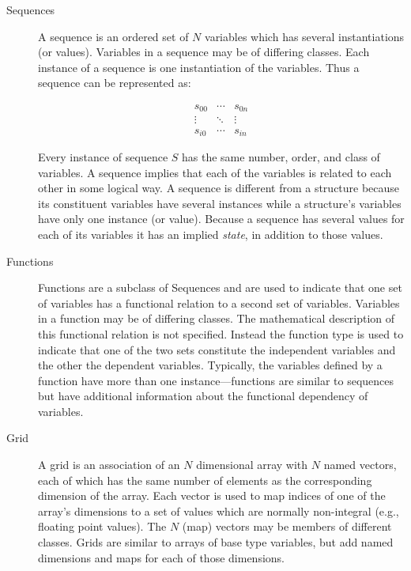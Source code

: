 \begin{description}
\item [Sequences] A sequence is an ordered set of $N$ variables which has
  several instantiations (or values). Variables in a sequence may be of
  differing classes.  Each instance of a sequence is one instantiation of the
  variables. Thus a sequence can be represented as:

\begin{displaymath}
\begin{array}{ccc}
  s_{0 0} & \cdots & s_{0 n} \\
  \vdots & \ddots & \vdots \\
  s_{i 0} & \cdots & s_{i n}
\end{array}
\end{displaymath}

\noindent Every instance of sequence $S$ has the same number, order, and
class of variables. A sequence implies that each of the variables is
related to each other in some logical way. A sequence is different from a
structure because its constituent variables have several instances while a
structure's variables have only one instance (or value). Because a sequence has
several values for each of its variables it has an implied {\em state}, in
addition to those values.

\item [Functions] Functions are a subclass of Sequences and are used to
  indicate that one set of variables has a functional relation to a second
  set of variables. Variables in a function may be of differing classes. The
  mathematical description of this functional relation is not
  specified. Instead the function type is used to indicate that one of the
  two sets constitute the independent variables and the other the dependent
  variables.  Typically, the variables defined by a function have more than
  one instance---functions are similar to sequences but have additional
  information about the functional dependency of variables.

\item [Grid] A grid is an association of an $N$ dimensional array with $N$
  named vectors, each of which has the same number of elements as the
  corresponding dimension of the array. Each vector is used to map indices of
  one of the array's dimensions to a set of values which are normally
  non-integral (e.g., floating point values). The $N$ (map) vectors may be
  members of different classes. Grids are similar to arrays of base type
  variables, but add named dimensions and maps for each of those dimensions.
  \label{page:grids} 

\end{description}

